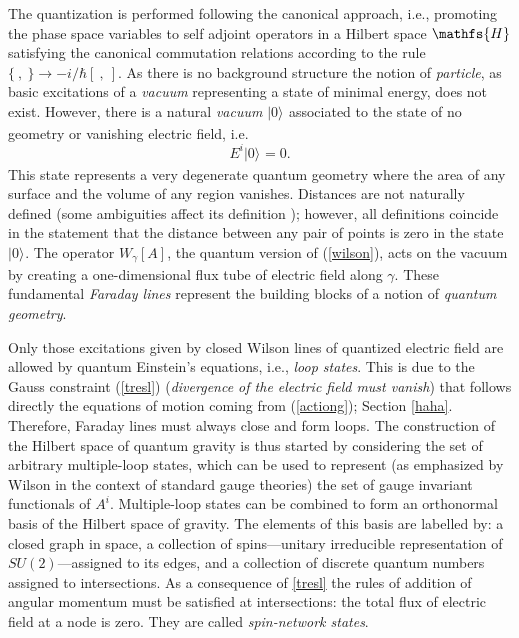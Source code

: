 \documentclass[aps, nofootinbib,superscriptaddress,12pt]{revtex4-2}
\def\be{\begin{equation}}
\def\ee{\end{equation}}
\newcommand{\mfs}[1]{\mathfs {#1}}                               %
\newcommand{\sH}{{\mfs H}}
\newcommand{\h}{{\sH}}
\begin{document}
The quantization is performed following the canonical approach,
i.e., promoting the phase space variables to self adjoint
operators in a Hilbert space $\h$ satisfying the canonical
commutation relations according to the rule $\{\ ,\ \}\rightarrow
-i/\hbar [\ ,\ ] $. 
As there is no background structure the notion of {\em particle},
as basic excitations of a {\em vacuum} representing a state of
minimal energy, does not exist. However, there is a natural {\em
vacuum} $|0\rangle_{}$ associated to the state of no geometry or vanishing electric field, i.e.  \be
{
E^i}|0\rangle_{}=0.\label{nogeo}
\ee
This state represents a very degenerate quantum
geometry where the area of any surface and the volume of any region vanishes. 
Distances are not naturally defined (some ambiguities affect its definition \cite{Thiemann:1996at, Bianchi:2008es}); however,
all definitions coincide in the statement that the distance between any pair of points is zero in the state $|0\rangle_{}$.
The operator $W_{\gamma}[A]$, the quantum version of (\ref{wilson}),  acts on the vacuum by creating a
one-dimensional flux tube of electric field along $\gamma$. These fundamental {\em
Faraday lines} represent the building blocks of a notion of {\em
quantum geometry}.

Only those excitations given by closed
Wilson lines of quantized electric field are allowed by quantum
Einstein's equations, i.e., {\em loop states}.
This is due to the  Gauss constraint (\ref{tresl}) ({\em divergence of the electric field must vanish}) 
that follows directly the equations of motion coming from (\ref{actiong}); Section \ref{haha}. 
Therefore, Faraday lines must always close and form loops.
The construction of the Hilbert space of quantum gravity is thus started by
considering the set of arbitrary multiple-loop states, which can
be used to represent (as emphasized by Wilson in the context of
standard gauge theories) the set of gauge invariant functionals of
$A^i$. Multiple-loop states can be combined to form an orthonormal basis
of the Hilbert space of gravity. The elements of this basis are
labelled by: a closed graph in space, a collection of
spins---unitary irreducible representation of $SU(2)$---assigned
to its edges, and a collection of discrete quantum numbers
assigned to intersections. As a consequence of \eqref{tresl} 
the rules of addition of angular momentum must be
satisfied at intersections: the total flux of electric field at a node is zero. They are called {\em spin-network
states}.
\end{document}
